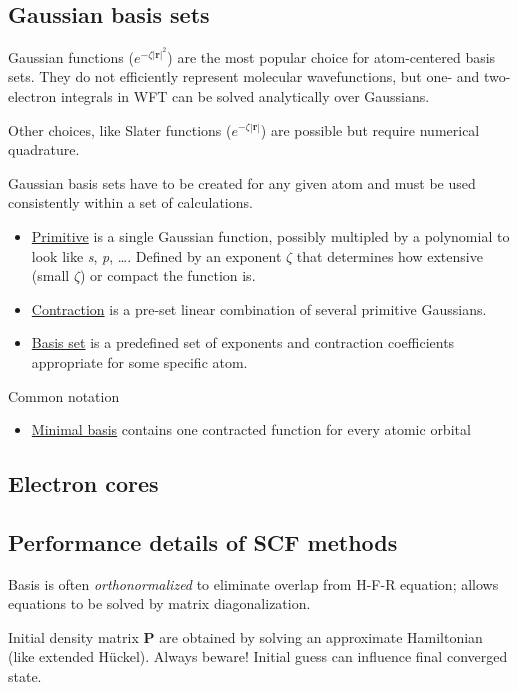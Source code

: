 \documentclass[11pt]{article}
\begin{document}
\subsection{Gaussian basis sets}
\label{sec-5-10}
Gaussian functions ($e^{-\zeta|\mathbf{r}|^2}$) are the most popular choice for atom-centered basis sets.  They do not efficiently represent molecular wavefunctions, but one- and two-electron integrals in  WFT  can be solved analytically over Gaussians.

Other choices, like Slater functions ($e^{-\zeta|\mathbf{r}|}$) are possible but require numerical quadrature.

Gaussian basis sets have to be created for any given atom and must be used consistently within a set of calculations.

\begin{itemize}
\item \uline{Primitive} is a single Gaussian function, possibly multipled by a polynomial to look like
\emph{s}, \emph{p}, \ldots.  Defined by an exponent $\zeta$ that determines how extensive (small $\zeta$) or compact
the function is.
\item \uline{Contraction} is a pre-set linear combination of several primitive Gaussians.
\item \uline{Basis set} is a predefined set of exponents and contraction coefficients appropriate
for some specific atom.
\end{itemize}

Common notation
\begin{itemize}
\item \uline{Minimal basis} contains one contracted function for every atomic orbital
\end{itemize}

\subsection{Electron cores}
\label{sec-5-11}

\subsection{Performance details of SCF methods}
\label{sec-5-12}
Basis is often \emph{orthonormalized} to eliminate overlap from H-F-R equation; allows equations to be solved by matrix diagonalization.

Initial density matrix \textbf{P} are obtained by solving an approximate Hamiltonian (like
extended H\"{u}ckel). Always beware! Initial guess can influence final converged state.
\end{document}
